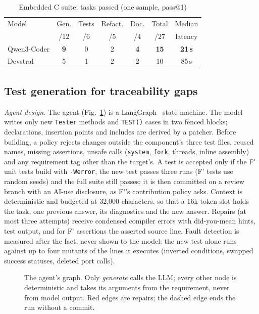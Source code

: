\documentclass[conference]{IEEEtran}
\newcommand{\Fp}{F\'{}}  %
\newcommand{\tool}[1]{\texttt{#1}}
\begin{document}
\begin{table}[t]
\caption{Embedded C suite: tasks passed (one sample, pass@1)}
\label{tab:eval}
\centering
\footnotesize
\setlength{\tabcolsep}{3.2pt}
\begin{tabular}{@{}lcccccc@{}}
\toprule
Model & Gen. & Tests & Refact. & Doc. & Total & Median \\
 & /12 & /6 & /5 & /4 & /27 & latency \\
\midrule
Qwen3-Coder & \textbf{9} & 0 & 2 & \textbf{4} & \textbf{15} & \textbf{21\,s} \\
Devstral & 5 & 1 & 2 & 2 & 10 & 85\,s \\
\bottomrule
\end{tabular}
\end{table}

\subsection{Test generation for traceability gaps}
\emph{Agent design.} The agent (Fig.~\ref{fig:agent}) is a LangGraph~\cite{langgraph} state machine. The model
writes only new \tool{Tester} methods and \tool{TEST()} cases in two fenced blocks; declarations, insertion points
and includes are derived by a patcher. Before building, a policy rejects changes outside the component's three test
files, reused names, missing assertions, unsafe calls (\tool{system}, \tool{fork}, threads, inline assembly) and
any requirement tag other than the target's. A test is accepted only if the \Fp{} unit tests build with
\tool{-Werror}, the new test passes three runs (\Fp{} tests use random seeds) and the full suite still passes; it
is then committed on a review branch with an AI-use disclosure, as \Fp{}'s contribution policy asks. Context is
deterministic and budgeted at 32{,}000 characters, so that a 16k-token slot holds the task, one previous answer,
its diagnostics and the new answer. Repairs (at most three attempts) receive condensed compiler errors with
did-you-mean hints, test output, and for \Fp{} assertions the asserted source line. Fault detection is measured
after the fact, never shown to the model: the new test alone runs against up to four mutants of the lines it
executes (inverted conditions, swapped success statuses, deleted port calls).

\begin{figure}[t]
\centering

\caption{The agent's graph. Only \emph{generate} calls the LLM; every other node is deterministic and takes its
arguments from the requirement, never from model output. Red edges are repairs; the dashed edge ends the run without a commit.}
\label{fig:agent}
\end{figure}
\end{document}
